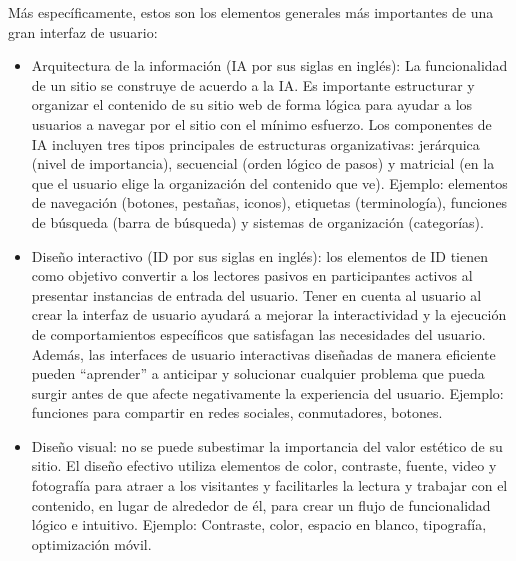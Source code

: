 
Más específicamente, estos son los elementos generales más importantes de una gran interfaz de usuario:


\begin{itemize}
\item Arquitectura de la información (IA por sus siglas en inglés): La funcionalidad de un sitio se construye de acuerdo a la IA. Es importante estructurar y organizar el contenido de su sitio web de forma lógica para ayudar a los usuarios a navegar por el sitio con el mínimo esfuerzo. Los componentes de IA incluyen tres tipos principales de estructuras organizativas: jerárquica (nivel de importancia), secuencial (orden lógico de pasos) y matricial (en la que el usuario elige la organización del contenido que ve).
Ejemplo: elementos de navegación (botones, pestañas, iconos), etiquetas (terminología), funciones de búsqueda (barra de búsqueda) y sistemas de organización (categorías).
\item Diseño interactivo (ID por sus siglas en inglés): los elementos de ID tienen como objetivo convertir a los lectores pasivos en participantes activos al presentar instancias de entrada del usuario. Tener en cuenta al usuario al crear la interfaz de usuario ayudará a mejorar la interactividad y la ejecución de comportamientos específicos que satisfagan las necesidades del usuario. Además, las interfaces de usuario interactivas diseñadas de manera eficiente pueden ``aprender'' a anticipar y solucionar cualquier problema que pueda surgir antes de que afecte negativamente la experiencia del usuario.
Ejemplo: funciones para compartir en redes sociales, conmutadores, botones.
\item Diseño visual: no se puede subestimar la importancia del valor estético de su sitio. El diseño efectivo utiliza elementos de color, contraste, fuente, video y fotografía para atraer a los visitantes y facilitarles la lectura y trabajar con el contenido, en lugar de alrededor de él, para crear un flujo de funcionalidad lógico e intuitivo.
Ejemplo: Contraste, color, espacio en blanco, tipografía, optimización móvil.
\end{itemize}

